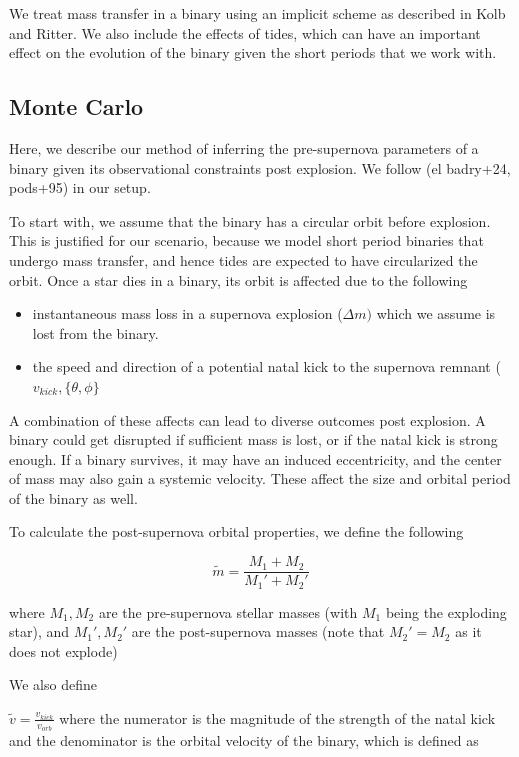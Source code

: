 \documentclass[linenumbers,trackchanges,twocolumn]{aastex701}
\begin{document}
We treat mass transfer in a binary using an implicit scheme as described in Kolb and Ritter. We also include the effects of tides, which can have an important effect on the evolution of the binary given the short periods that we work with. 

\subsection{Monte Carlo}

Here, we describe our method of inferring the pre-supernova parameters of a binary given its observational constraints post explosion. We follow (el badry+24, pods+95) in our setup. 

To start with, we assume that the binary has a circular orbit before explosion. This is justified for our scenario, because we model short period binaries that undergo mass transfer, and hence tides are expected to have circularized the orbit. Once a star dies in a binary, its orbit is affected due to the following

\begin{itemize}
    \item instantaneous mass loss in a supernova explosion ($\Delta m)$ which we assume is lost from the binary. 
    \item the speed and direction of a potential natal kick to the supernova remnant ($v_{kick}, \{\theta,\phi\}$
\end{itemize}

A combination of these affects can lead to diverse outcomes post explosion. A binary could get disrupted if sufficient mass is lost, or if the natal kick is strong enough. If a binary survives, it may have an induced eccentricity, and the center of mass may also gain a systemic velocity. These affect the size and orbital period of the binary as well. 

To calculate the post-supernova orbital properties, we define the following

\begin{equation}
    \tilde{m} = \frac{M_1 + M_2}{M_1' + M_2'}
\end{equation}

where $M_1,M_2$ are the pre-supernova stellar masses (with $M_1$ being the exploding star), and $M_1',M_2'$ are the post-supernova masses (note that $M_2' = M_2$ as it does not explode)

We also define 

$\tilde{v} = \frac{v_{kick}}{v_{orb}}$ where the numerator is the magnitude of the strength of the natal kick and the denominator is the orbital velocity of the binary, which is defined as
\end{document}
